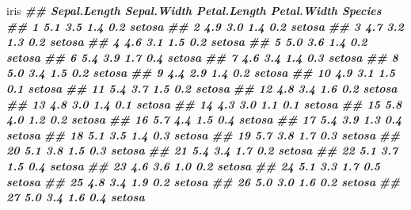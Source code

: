 \documentclass[
]{book}
\newenvironment{Shaded}{\begin{snugshade}}{\end{snugshade}}
\newcommand{\DocumentationTok}[1]{\textcolor[rgb]{0.56,0.35,0.01}{\textbf{\textit{#1}}}}
\newcommand{\NormalTok}[1]{#1}
\begin{document}
\begin{Shaded}
\begin{Highlighting}[]
\NormalTok{iris}
\DocumentationTok{\#\#     Sepal.Length Sepal.Width Petal.Length Petal.Width    Species}
\DocumentationTok{\#\# 1            5.1         3.5          1.4         0.2     setosa}
\DocumentationTok{\#\# 2            4.9         3.0          1.4         0.2     setosa}
\DocumentationTok{\#\# 3            4.7         3.2          1.3         0.2     setosa}
\DocumentationTok{\#\# 4            4.6         3.1          1.5         0.2     setosa}
\DocumentationTok{\#\# 5            5.0         3.6          1.4         0.2     setosa}
\DocumentationTok{\#\# 6            5.4         3.9          1.7         0.4     setosa}
\DocumentationTok{\#\# 7            4.6         3.4          1.4         0.3     setosa}
\DocumentationTok{\#\# 8            5.0         3.4          1.5         0.2     setosa}
\DocumentationTok{\#\# 9            4.4         2.9          1.4         0.2     setosa}
\DocumentationTok{\#\# 10           4.9         3.1          1.5         0.1     setosa}
\DocumentationTok{\#\# 11           5.4         3.7          1.5         0.2     setosa}
\DocumentationTok{\#\# 12           4.8         3.4          1.6         0.2     setosa}
\DocumentationTok{\#\# 13           4.8         3.0          1.4         0.1     setosa}
\DocumentationTok{\#\# 14           4.3         3.0          1.1         0.1     setosa}
\DocumentationTok{\#\# 15           5.8         4.0          1.2         0.2     setosa}
\DocumentationTok{\#\# 16           5.7         4.4          1.5         0.4     setosa}
\DocumentationTok{\#\# 17           5.4         3.9          1.3         0.4     setosa}
\DocumentationTok{\#\# 18           5.1         3.5          1.4         0.3     setosa}
\DocumentationTok{\#\# 19           5.7         3.8          1.7         0.3     setosa}
\DocumentationTok{\#\# 20           5.1         3.8          1.5         0.3     setosa}
\DocumentationTok{\#\# 21           5.4         3.4          1.7         0.2     setosa}
\DocumentationTok{\#\# 22           5.1         3.7          1.5         0.4     setosa}
\DocumentationTok{\#\# 23           4.6         3.6          1.0         0.2     setosa}
\DocumentationTok{\#\# 24           5.1         3.3          1.7         0.5     setosa}
\DocumentationTok{\#\# 25           4.8         3.4          1.9         0.2     setosa}
\DocumentationTok{\#\# 26           5.0         3.0          1.6         0.2     setosa}
\DocumentationTok{\#\# 27           5.0         3.4          1.6         0.4     setosa}

\end{Highlighting}
\end{Shaded}
\end{document}
